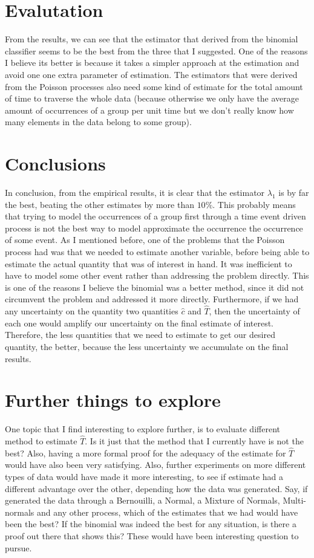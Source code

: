 \documentclass[a4paper]{article}
\begin{document}
\section{Evalutation}

From the results, we can see that the estimator that derived from the binomial classifier seems to be the best from the three that I suggested. 
One of the reasons I believe its better is because it takes a simpler approach at the estimation and avoid one one extra parameter of estimation.
The estimators that were derived from the Poisson processes also need some kind of estimate for the total amount of time to traverse the whole data (because otherwise we only have the average amount of occurrences of a group per unit time but we don't really know how many elements in the data belong to some group).

\section{Conclusions}

In conclusion, from the empirical results, it is clear that the estimator $\lambda_1$ is by far the best, beating the other estimates by more than $10\%$.
This probably means that trying to model the occurrences of a group first through a time event driven process is not the best way to model approximate the occurrence the occurrence of some event.
As I mentioned before, one of the problems that the Poisson process had was that we needed to estimate another variable, before being able to estimate the actual quantity that was of interest in hand.
It was inefficient to have to model some other event rather than addressing the problem directly.
This is one of the reasons I believe the binomial was a better method, since it did not circumvent the problem and addressed it more directly.
Furthermore, if we had any uncertainty on the quantity two quantities $\hat{c}$ and $\hat{T}$, then the uncertainty of each one would amplify our uncertainty on the final estimate of interest.
Therefore, the less quantities that we need to estimate to get our desired quantity, the better, because the less uncertainty we accumulate on the final results. 

\section{Further things to explore}

One topic that I find interesting to explore further, is to evaluate different method to estimate $\hat{T}$.
Is it just that the method that I currently have is not the best?
Also, having a more formal proof for the adequacy of the estimate for $\hat{T}$ would have also been very satisfying.
Also, further experiments on more different types of data would have made it more interesting, to see if estimate had a different advantage over the other, depending how the data was generated.
Say, if generated the data through a Bernouilli, a Normal, a Mixture of Normals, Multi-normals and any other process, which of the estimates that we had would have been the best?
If the binomial was indeed the best for any situation, is there a proof out there that shows this?
These would have been interesting question to pursue.
\end{document}
